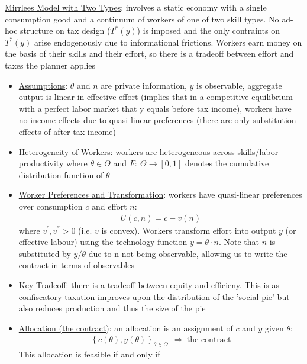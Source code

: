 \documentclass{article}
\begin{document}
\vspace{2.5mm}
\par \underline{Mirrlees Model with Two Types}: involves a static economy with a single consumption good and a continuum of workers of one of two skill types. No ad-hoc structure on tax design ($T^{*}(y)$) is imposed and the only contraints on $T^{*}(y)$ arise endogenously due to informational frictions. Workers earn money on the basis of their skills and their effort, so there is a tradeoff between effort and taxes the planner applies
\begin{itemize}
    \item  \underline{Assumptions}: $\theta$ and $n$ are private information, $y$ is observable, aggregate output is linear in effective effort (implies that in a competitive equilibrium with a perfect labor market that y equals before tax income), workers have no income effects due to quasi-linear preferences (there are only substitution effects of after-tax  income)
    \item  \underline{Heterogeneity of Workers}: workers are heterogeneous across skills/labor productivity where $\theta \in \Theta$ and $F: \ \Theta \rightarrow [0,1]$ denotes the cumulative distribution function of $\theta$
    \item  \underline{Worker Preferences and Transformation}: workers have quasi-linear preferences over consumption $c$ and effort $n$:
    \begin{gather*}
        U(c,n) = c - v(n)
    \end{gather*}
    where $v^{'}, v^{''} > 0$ (i.e. $v$ is convex). Workers transform effort into output $y$ (or effective labour) using the technology function $y = \theta \cdot n$. Note that $n$ is substituted by $y/\theta$ due to n not being observable, allowing us to write the contract in terms of observables
    \item  \underline{Key Tradeoff}: there is a tradeoff between equity and efficieny. This is as confiscatory taxation improves upon the distribution of the 'social pie' but also reduces production and thus the size of the pie
    \item  \underline{Allocation (the contract)}: an allocation is an assignment of $c$ and $y$ given $\theta$:
    \begin{gather*}
        \left\{ c(\theta), y(\theta) \right\}_{\theta \in \Theta} \ \ \Rightarrow \ \text{the contract}
    \end{gather*}
    This allocation is feasible if and only if
    \begin{gather*}

\end{gather*}
\end{itemize}
\end{document}
